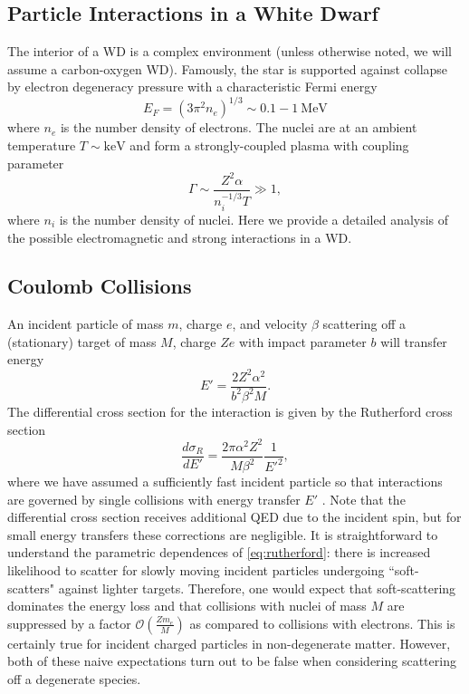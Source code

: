 \documentclass[twocolumn,showpacs,preprintnumbers,amsmath,amssymb,prd]{revtex4}
\newcommand{\OO}{\mathcal{O}}
\def\r{\right)}
\def\l{\left(}
\begin{document}
\begin{appendices}

\section{Particle Interactions in a White Dwarf}
\label{sec:appendix}

The interior of a WD is a complex environment (unless otherwise noted, we will assume a carbon-oxygen WD). Famously, the star is supported against collapse by electron degeneracy pressure with a characteristic Fermi energy
\begin{equation}
E_F = (3 \pi^2 n_e)^{1/3} \sim 0.1 - 1 ~\text{MeV}
\end{equation}
where $n_e$ is the number density of electrons. The nuclei are at an ambient temperature $T \sim \text{keV}$ and form a strongly-coupled plasma with coupling parameter
\begin{equation}
\Gamma \sim \frac{Z^2 \alpha}{n_i^{-1/3} T} \gg 1,
\end{equation}
where $n_i$ is the number density of nuclei. Here we provide a detailed analysis of the possible electromagnetic and strong interactions in a WD.

\subsection*{Coulomb Collisions}

An incident particle of mass $m$, charge $e$, and velocity $\beta$ scattering off a (stationary) target of mass $M$, charge $Ze$ with impact parameter $b$ will transfer energy
\begin{equation}
\label{eq:impact}
E' = \frac{2 Z^2 \alpha^2}{b^2 \beta ^2 M}.
\end{equation}
The differential cross section for the interaction is given by the Rutherford cross section
\begin{equation}
\label{eq:rutherford}
\frac{d \sigma_R}{dE'} = \frac{2 \pi  \alpha^2 Z^2}{M \beta^2} \frac{1}{E'^2},
 \end{equation}
where we have assumed a sufficiently fast incident particle so that interactions are governed by single collisions with energy transfer $E'$ \cite{Agashe:2014kda}.  Note that the differential cross section receives additional QED due to the incident spin, but for small energy transfers these corrections are negligible. It is straightforward to understand the parametric dependences of \eqref{eq:rutherford}: there is increased likelihood to scatter for slowly moving incident particles undergoing ``soft-scatters" against lighter targets. Therefore, one would expect that soft-scattering dominates the energy loss and that collisions with nuclei of mass $M$ are suppressed by a factor $\OO\l\frac{Z m_e}{M}\r$ as compared to collisions with electrons. This is certainly true for incident charged particles in non-degenerate matter. However, both of these naive expectations turn out to be false when considering scattering off a degenerate species.


\end{appendices}
\end{document}
